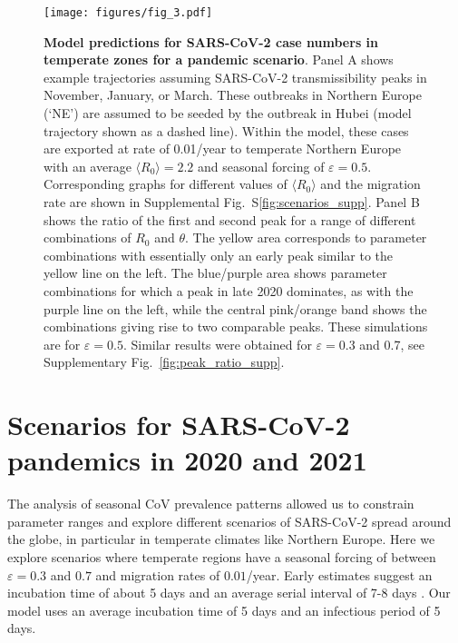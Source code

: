 \documentclass[rmp, reprint, superscriptaddress, floatfix,amsmath]{revtex4-1}
\newcommand{\forcing}{\varepsilon}
\begin{document}
\begin{figure}
    \centering
    \texttt{[image: figures/fig\_3.pdf]}
\caption{{\bf Model predictions for SARS-CoV-2 case numbers in temperate zones for a pandemic scenario}. Panel A shows example trajectories assuming SARS-CoV-2 transmissibility peaks in November, January, or March.
These outbreaks in Northern Europe (`NE') are assumed to be seeded by the outbreak in Hubei (model trajectory shown as a dashed line).
Within the model, these cases are exported at rate of 0.01/year to temperate Northern Europe with an average $\langle R_0\rangle = 2.2$ and seasonal forcing of $\forcing=0.5$. Corresponding graphs for different values of $\langle R_0\rangle$ and the migration rate are shown in Supplemental Fig.~S\ref{fig:scenarios_supp}.
Panel B shows the ratio of the first and second peak for a range of different combinations of $R_0$ and $\theta$.
The yellow area corresponds to parameter combinations with essentially only an early peak similar to the yellow line on the left.
The blue/purple area shows parameter combinations for which a peak in late 2020 dominates, as with the purple line on the left, while the central pink/orange band shows the combinations giving rise to two comparable peaks.
These simulations are for $\forcing=0.5$. Similar results were obtained for $\forcing=0.3$ and 0.7, see Supplementary  Fig.~\ref{fig:peak_ratio_supp}.}
    \label{fig:nCov_predictions}
\end{figure}

\section{Scenarios for SARS-CoV-2 pandemics in 2020 and 2021}
\label{section:sars_pandemic_regional}
The analysis of seasonal CoV prevalence patterns allowed us to constrain parameter ranges and explore different scenarios of SARS-CoV-2 spread around the globe, in particular in temperate climates like Northern Europe.
Here we explore scenarios where temperate regions have a seasonal forcing of between $\forcing=0.3$ and $0.7$ and migration rates of $0.01$/year.
Early estimates suggest an incubation time of about 5 days and an average serial interval of 7-8 days \citep{wu_nowcasting_2020}.
Our model uses an average incubation time of 5 days \citep{backer_incubation_2020} and an infectious period of 5 days.
\end{document}
